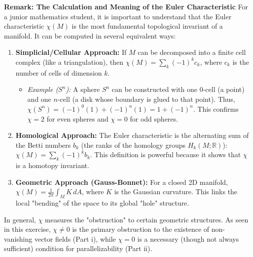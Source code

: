 \begin{solution}
\textbf{Remark: The Calculation and Meaning of the Euler Characteristic}
For a junior mathematics student, it is important to understand that the Euler characteristic $\chi(M)$ is the most fundamental topological invariant of a manifold. It can be computed in several equivalent ways:
\begin{enumerate}
    \item \textbf{Simplicial/Cellular Approach:} If $M$ can be decomposed into a finite cell complex (like a triangulation), then $\chi(M) = \sum_{k} (-1)^k c_k$, where $c_k$ is the number of cells of dimension $k$. 
    \begin{itemize}
        \item \textit{Example ($S^n$):} A sphere $S^n$ can be constructed with one 0-cell (a point) and one $n$-cell (a disk whose boundary is glued to that point). Thus, $\chi(S^n) = (-1)^0(1) + (-1)^n(1) = 1 + (-1)^n$. This confirms $\chi = 2$ for even spheres and $\chi = 0$ for odd spheres.
    \end{itemize}
    \item \textbf{Homological Approach:} The Euler characteristic is the alternating sum of the Betti numbers $b_k$ (the ranks of the homology groups $H_k(M; \mathbb{R})$): $\chi(M) = \sum_{k} (-1)^k b_k$. This definition is powerful because it shows that $\chi$ is a homotopy invariant.
    \item \textbf{Geometric Approach (Gauss-Bonnet):} For a closed 2D manifold, $\chi(M) = \frac{1}{2\pi} \int_M K \, dA$, where $K$ is the Gaussian curvature. This links the local "bending" of the space to its global "hole" structure.
\end{enumerate}
In general, $\chi$ measures the "obstruction" to certain geometric structures. As seen in this exercise, $\chi \neq 0$ is the primary obstruction to the existence of non-vanishing vector fields (Part i), while $\chi = 0$ is a necessary (though not always sufficient) condition for parallelizability (Part ii).


\end{solution}
